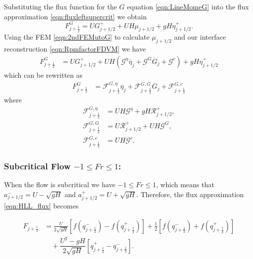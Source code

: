 Substituting the flux function for the $G$ equation \eqref{eqn:LineMomeG} into the flux approximation \eqref{eqn:fluxleftsupercrit} we obtain
\begin{equation*}
F^G_{j+\frac{1}{2}} =U G^+_{j+1/2} + U  H \mu_{j+1/2} + gH \eta^+_{j+1/2}.
\end{equation*}
Using the FEM \eqref{eqn:2ndFEMutoG} to calculate $\mu_{j+1/2}$ and our interface reconstruction \eqref{eqn:RpmfactorFDVM} we have
\begin{align*}
F^G_{j+\frac{1}{2}} &=  U G^+_{j+1/2} + UH \left(\mathcal{G}^{\eta} \overline{\eta}_{j} + \mathcal{G}^G \overline{G}_{j} + \mathcal{G}^c\right) + gH \eta^+_{j+1/2}
\end{align*}
which can be rewritten as
\begin{align*}
F^G_{j+\frac{1}{2}} &= \mathcal{F}^{G, \eta}_{j+\frac{1}{2}} \overline{\eta}_{j} + \mathcal{F}^{G, G}_{j+\frac{1}{2}} \overline{G}_{j} + \mathcal{F}^{G, c}_{j+\frac{1}{2}}
\end{align*}
where
\begin{align*}
\mathcal{F}^{G, \eta}_{j+\frac{1}{2}} &=  UH \mathcal{G}^{\eta} + gH \mathcal{R}^+_{j+1/2},\\
\mathcal{F}^{G, G}_{j+\frac{1}{2}} &=  U\mathcal{R}^+_{j+1/2}  +  UH \mathcal{G}^G, \\
\mathcal{F}^{G, c}_{j+\frac{1}{2}} &=  UH\mathcal{G}^c.
\end{align*}


\subsubsection{Subcritical Flow $-1 \le Fr \le 1$:}
When the flow is subcritical we have $-1\le Fr \le 1$, which means that $a^-_{j+ 1/2} =U-\sqrt{g H}$ and $a^+_{j+ 1/2} =  U + \sqrt{g H}$. Therefore, the flux approximation \eqref{eqn:HLL_flux} becomes

\begin{align}
F_{j+\frac{1}{2}} &= \frac{U}{2 \sqrt{gH}} \left[f\left(q^-_{j+\frac{1}{2}}\right) - f\left(q^+_{j+\frac{1}{2}}\right) \right]  + \frac{1}{2}\left[f\left(q^-_{j+\frac{1}{2}}\right) + f\left(q^+_{j+\frac{1}{2}}\right)\right] \nonumber \\ & \quad  + \dfrac{U^2 - gH}{2\sqrt{g H}} \left [ q^+_{j+\frac{1}{2}} - q^-_{j+\frac{1}{2}} \right ].
\label{eqn:fluxsubcrit}
\end{align}

